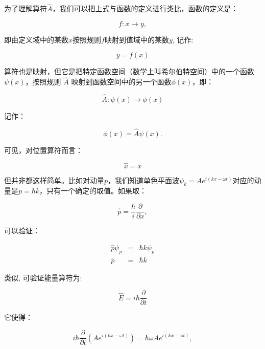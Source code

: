 为了理解算符$\hat A$，我们可以把上式与函数的定义进行类比，函数的定义是：

\begin{equation*}
f: x \to y ,
\end{equation*}

即由定义域中的某数$x$按照规则$f$映射到值域中的某数$y$, 记作: 

\begin{equation*}
y = f(x)
\end{equation*}

算符也是映射，但它是把特定函数空间（数学上叫希尔伯特空间）中的一个函数$\psi(x)$，按照规则 $\hat A$ 映射到函数空间中的另一个函数$\phi(x)$，即：

\begin{equation*}
\hat A: \psi(x) \to \phi(x)
\end{equation*}

记作：

\begin{equation*}
\phi(x) = \hat A \psi(x) .
\end{equation*}

可见，对位置算符而言：

\begin{equation}
\hat x = x
\end{equation}

但并非都这样简单。比如对动量$p$，我们知道单色平面波$\psi_k = A e^{i(kx -\omega t)}$对应的动量是$p =\hbar
k$，只有一个确定的取值。如果取：

\begin{equation}
\hat p = \frac{\hbar}{i} \frac{\partial}{\partial x},
\end{equation}

可以验证：

\begin{eqnarray}
\hat p \psi_p &=& \hbar k \psi_p \\
\bar p &=& \hbar k
\end{eqnarray}

类似, 可验证能量算符为:

\begin{equation}
    \hat E = i \hbar \frac{\partial }{\partial t}
\end{equation}

它使得：

\begin{equation}
i \hbar \frac{\partial }{\partial t} \left( A e^{i (kx-\omega t)} \right)= \hbar \omega A e^{i (kx-\omega t)} ,
\end{equation}


